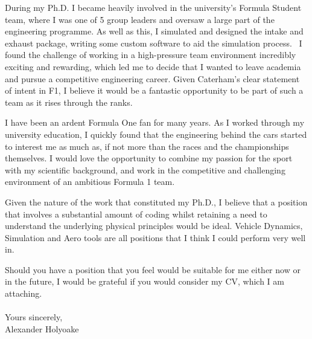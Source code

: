 \documentclass[a4paper,10pt]{article}
\begin{document}
During my Ph.D. I became heavily involved in the university's Formula Student team, where I was one of 5 group leaders and oversaw a large part of the engineering programme. As well as this, I simulated and designed the intake and exhaust package, writing some custom software to aid the simulation process.  I found the challenge of working in a high-pressure team environment incredibly exciting and rewarding, which led me to decide that I wanted to leave academia and pursue a competitive engineering career. Given Caterham’s clear statement of intent in F1, I believe it would be a fantastic opportunity to be part of such a team as it rises through the ranks.

I have been an ardent Formula One fan for many years. As I worked through my university education, I quickly found that the engineering behind the cars started to interest me as much as, if not more than the races and the championships themselves. I would love the opportunity to combine my passion for the sport with my scientific background, and work in the competitive and challenging environment of an ambitious Formula 1 team. 

Given the nature of the work that constituted my Ph.D., I believe that a position that involves a substantial amount of coding whilst retaining a need to understand the underlying physical principles would be ideal. Vehicle Dynamics, Simulation and Aero tools are all positions that I think I could perform very well in.

Should you have a position that you feel would be suitable for me either now or in the future, I would be grateful if you would consider my CV, which I am attaching.
\\
\noindent
\\
Yours sincerely,\\ 

Alexander Holyoake   
\end{document}
